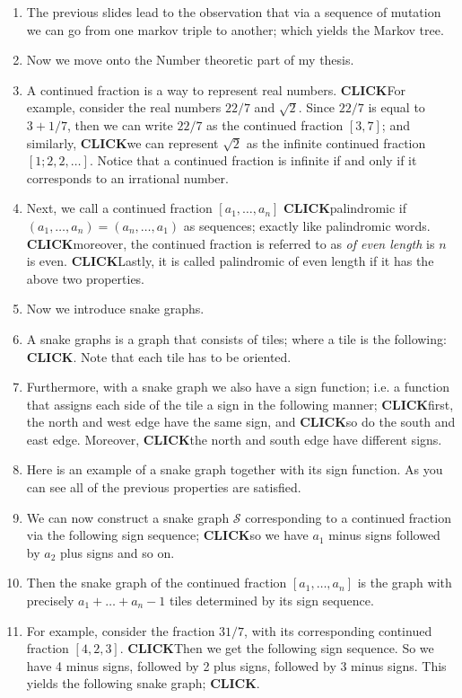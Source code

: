 \documentclass{article}
\newcommand{\click}{\textbf{CLICK}}
\begin{document}
\begin{enumerate}
    \item The previous slides lead to the observation that via a sequence of mutation we can go from one markov triple to another; which yields the Markov tree.
    \item Now we move onto the Number theoretic part of my thesis.
    \item A continued fraction is a way to represent real numbers. \click For example, consider the real numbers $22/7$ and $\sqrt{2}$. Since $22/7$ is equal to $3 + 1/7$, then we can write $22/7$ as the continued fraction $[3,7]$; and similarly, \click we can represent $\sqrt{2}$ as the infinite continued fraction $[1;2,2,\dots]$. Notice that a continued fraction is infinite if and only if it corresponds to an irrational number. 
    \item Next, we call a continued fraction $[a_1,\dots,a_n]$  \click palindromic if $(a_1,\dots,a_n) = (a_n,\dots,a_1)$ as sequences; exactly like palindromic words. \click moreover, the continued fraction is referred to as \emph{of even length} is $n$ is even. \click Lastly, it is called palindromic of even length if it has the above two properties.
    \item Now we introduce snake graphs.
    \item A snake graphs is a graph that consists of tiles; where a tile is the following: \click. Note that each tile has to be oriented. 
    \item Furthermore, with a snake graph we also have a sign function; i.e. a function that assigns each side of the tile a sign in the following manner; \click first, the north and west edge have the same sign, and \click so do the south and east edge. Moreover, \click the north and south edge have different signs. 
    \item Here is an example of a snake graph together with its sign function. As you can see all of the previous properties are satisfied. 
    \item We can now construct a snake graph $\mathcal{S}$ corresponding to a continued fraction via the following sign sequence; \click so we have $a_1$ minus signs followed by $a_2$ plus signs and so on. 
    \item Then the snake graph of the continued fraction $[a_1,\dots,a_n]$ is the graph with precisely $a_1+\dots+a_n -1$ tiles determined by its sign sequence. 
    \item For example, consider the fraction $31/7$, with its corresponding continued fraction $[4,2,3]$. \click Then we get the following sign sequence. So we have 4 minus signs, followed by 2 plus signs, followed by 3 minus signs. This yields the following snake graph; \click.

\end{enumerate}
\end{document}
